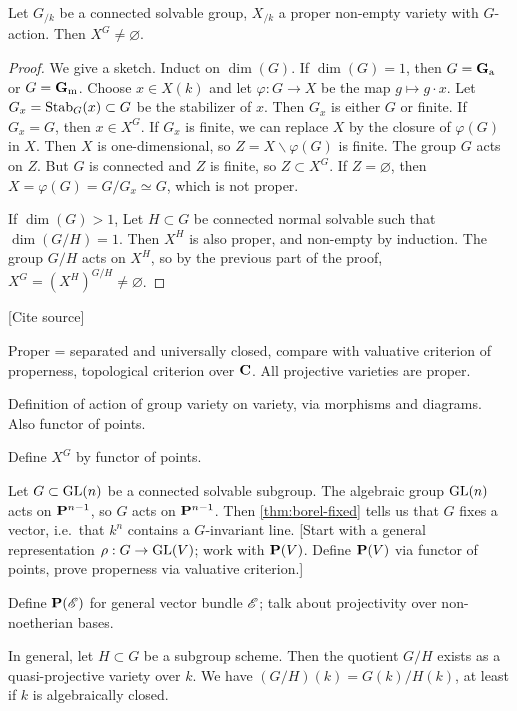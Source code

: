 \begin{theorem}\label{thm:borel-fixed}
Let $G_{/k}$ be a connected solvable group, $X_{/k}$ a proper 
non-empty variety with $G$-action. Then 
$X^G\ne\varnothing$. 
\end{theorem}
\begin{proof}
We give a sketch. Induct on $\dim(G)$. If $\dim(G)=1$, then 
$G=\mathbf{G}_\mathrm{a}$ or $G=\mathbf{G}_\mathrm{m}$. Choose $x\in X(k)$ and let $\varphi:G\to X$ be the 
map $g\mapsto g\cdot x$. Let $G_x=\operatorname{Stab}_G(x)\subset G$ be the 
stabilizer of $x$. Then $G_x$ is either $G$ or finite. If $G_x=G$, then 
$x\in X^G$. If $G_x$ is finite, we can replace $X$ by the closure of 
$\varphi(G)$ in $X$. Then $X$ is one-dimensional, so 
$Z=X\smallsetminus \varphi(G)$ is finite. The group $G$ acts on $Z$. But $G$ 
is connected and $Z$ is finite, so $Z\subset X^G$. If $Z=\varnothing$, then 
$X=\varphi(G)=G/G_x\simeq G$, which is not proper. 

If $\dim(G)>1$, Let $H\subset G$ be connected normal solvable such that 
$\dim(G/H)=1$. Then $X^H$ is also proper, and non-empty by induction. The 
group $G/H$ acts on $X^H$, so by the previous part of the proof, 
$X^G=(X^H)^{G/H}\ne\varnothing$. 
\end{proof}

[Cite source]

Proper = separated and universally closed, compare with valuative 
criterion of properness, topological criterion over $\mathbf{C}$. All projective 
varieties are proper. 

Definition of action of group variety on variety, via morphisms and 
diagrams. Also functor of points. 

Define $X^G$ by functor of points. 

\begin{example}
Let $G\subset \operatorname{GL}(n)$ be a connected solvable subgroup. The algebraic group 
$\operatorname{GL}(n)$ acts on $\mathbf{P}^{n-1}$, so $G$ acts on $\mathbf{P}^{n-1}$. Then 
\autoref{thm:borel-fixed} tells us that $G$ fixes a vector, i.e.~that 
$k^n$ contains a $G$-invariant line. [Start with a general representation 
$\rho:G\to \operatorname{GL}(V)$; work with $\mathbf{P}(V)$. Define $\mathbf{P}(V)$ via functor of 
points, prove properness via valuative criterion.]
\end{example}

\begin{hard}
Define $\mathbf{P}(\mathscr{E})$ for general vector bundle $\mathscr{E}$; talk about 
projectivity over non-noetherian bases. 
\end{hard}


In general, let $H\subset G$ be a subgroup scheme. Then the quotient 
$G/H$ exists as a quasi-projective variety over $k$. We have 
$(G/H)(k)=G(k)/H(k)$, at least if $k$ is algebraically closed. 

